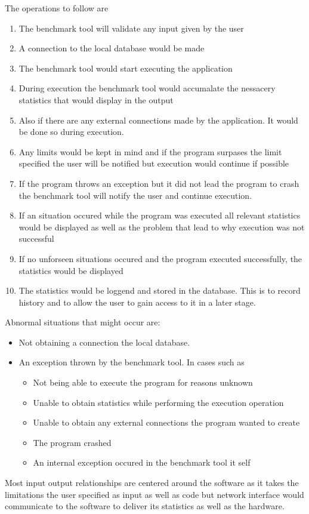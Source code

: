 \documentclass[a4paper,12pt]{article}
\begin{document}
 The operations to follow are
\begin{enumerate}
\item The benchmark tool will validate any input given by the user
\item A connection to the local database would be made
\item The benchmark tool would start executing the application
\item During execution the benchmark tool would accumalate the nessacery statistics that would display in the output
\item Also if there are any external connections made by the application. It would be done so during execution. 
\item Any limits would be kept in mind and if the program surpases the limit specified the user will be notified but execution would continue if possible
\item  If the program throws an exception but it did not lead the program to crash the benchmark tool will notify the user and continue execution.
\item If an situation occured while the program was executed all relevant statistics would be displayed as well as the problem that lead to why execution was not successful
\item If no unforseen situations occured and the program executed successfully, the statistics would be displayed
\item The statistics would be loggend and stored in the database. This is to record history and to allow the user to gain access to it in a later stage.
\end{enumerate}

Abnormal situations that might occur are:
\begin{itemize}
\item Not obtaining a connection the local database. 
\item An exception thrown by the benchmark tool. In cases such as
\begin{itemize}
\item Not being able to execute the program for reasons unknown
\item Unable to obtain statistics while performing the execution operation
\item Unable to obtain any external connections the program wanted to create
\item The program crashed 
\item An internal exception occured in the benchmark tool it self
\end{itemize}
 
\end{itemize}
Most input output relationships are centered around the software as it takes the limitations the user specified as input as well as code but network interface would communicate to the software to deliver its statistics as well as the hardware. 
\end{document}
